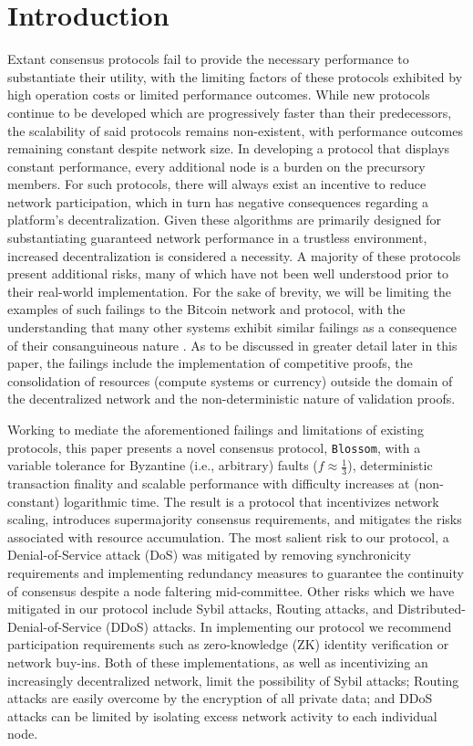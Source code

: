 \section{Introduction}

Extant consensus protocols fail to provide the necessary performance to substantiate their utility, with the limiting factors of these protocols exhibited by high operation costs or limited performance outcomes. While new protocols continue to be developed which are progressively faster than their predecessors, the scalability of said protocols remains non-existent, with performance outcomes remaining constant despite network size. In developing a protocol that displays constant performance, every additional node is a burden on the precursory members. For such protocols, there will always exist an incentive to reduce network participation, which in turn has negative consequences regarding a platform's decentralization. Given these algorithms are primarily designed for substantiating guaranteed network performance in a trustless environment, increased decentralization is considered a necessity.
A majority of these protocols present additional risks, many of which have not been well understood prior to their real-world implementation. For the sake of brevity, we will be limiting the examples of such failings to the Bitcoin network and protocol, with the understanding that many other systems exhibit similar failings as a consequence of their consanguineous nature \cite{Nakamoto2008}. As to be discussed in greater detail later in this paper, the failings include the implementation of competitive proofs, the consolidation of resources (compute systems or currency) outside the domain of the decentralized network and the non-deterministic nature of validation proofs.

Working to mediate the aforementioned failings and limitations of existing protocols, this paper presents a novel consensus protocol, \texttt{Blossom}, with a variable tolerance for Byzantine (i.e., arbitrary) faults (\(f \approx \frac{1}{3}\)), deterministic transaction finality and scalable performance with difficulty increases at (non-constant) logarithmic time. The result is a protocol that incentivizes network scaling, introduces supermajority consensus requirements, and mitigates the risks associated with resource accumulation. 
The most salient risk to our protocol, a Denial-of-Service attack (DoS) was mitigated by removing synchronicity requirements and implementing redundancy measures to guarantee the continuity of consensus despite a node faltering mid-committee. Other risks which we have mitigated in our protocol include Sybil attacks, Routing attacks, and Distributed-Denial-of-Service (DDoS) attacks. In implementing our protocol we recommend participation requirements such as zero-knowledge (ZK) identity verification or network buy-ins. Both of these implementations, as well as incentivizing an increasingly decentralized network, limit the possibility of Sybil attacks; Routing attacks are easily overcome by the encryption of all private data; and DDoS attacks can be limited by isolating excess network activity to each individual node.

